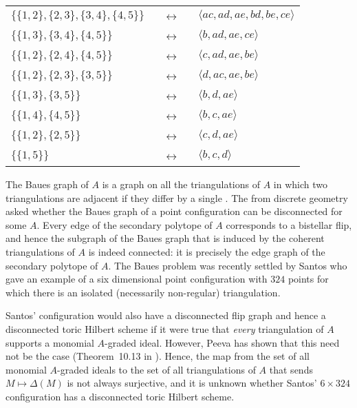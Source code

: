 \begin{tabular}{lll}
{$\{\{1,2\},\{2,3\},\{3,4\},\{4,5\}\}$}
&\,\,\,\,$\leftrightarrow$\,\,\,\,& $\langle ac, ad, ae, bd, be, ce
\rangle$ \\  
{$\{\{1,3\},\{3,4\},\{4,5\}\}$} &\,\,\,\,$\leftrightarrow$\,\,\,\,&
$\langle b, ad, ae, ce \rangle$ \\  
{$\{\{1,2\},\{2,4\},\{4,5\}\}$} &\,\,\,\,$\leftrightarrow$\,\,\,\,&
$\langle c, ad, ae, be \rangle$ \\ 
{$\{\{1,2\},\{2,3\},\{3,5\}\}$} &\,\,\,\,$\leftrightarrow$\,\,\,\,&
$\langle d, ac, ae, be \rangle$ \\  
{$\{\{1,3\},\{3,5\}\}$} &\,\,\,\,$\leftrightarrow$\,\,\,\,& $\langle
b, d, ae \rangle$ \\ 
{$\{\{1,4\},\{4,5\}\}$} &\,\,\,\,$\leftrightarrow$\,\,\,\,& $\langle
b, c, ae \rangle$ \\  
{$\{\{1,2\},\{2,5\}\}$} &\,\,\,\,$\leftrightarrow$\,\,\,\,& $\langle
c, d, ae \rangle$ \\ 
{$\{\{1,5\}\}$} &\,\,\,\,$\leftrightarrow$\,\,\,\,& $\langle b, c, d
\rangle$   
\end{tabular}

\medskip

The Baues graph of $A$ is a graph on all the triangulations of
$A$ in which two triangulations are adjacent if they differ by a
single {\em {}} \cite{HS:Reiner}. The {\em {}} from
discrete geometry asked whether the Baues graph of a point
configuration can be disconnected for some $A$. Every edge of the
secondary polytope of $A$ corresponds to a bistellar flip, and hence
the subgraph of the Baues graph that is induced by the coherent
triangulations of $A$ is indeed connected: it is precisely the edge
graph of the secondary polytope of $A$.  The Baues problem was
recently settled by Santos \cite{HS:San} who gave an example of a six
dimensional point configuration with $324$ points for which there is
an isolated (necessarily non-regular) triangulation.

Santos' configuration would also have a disconnected flip graph and hence
a disconnected toric Hilbert scheme if it were true that {\em every} 
triangulation of $A$ supports a monomial $A$-graded
ideal. However, Peeva has shown that this need not be the case
(Theorem~10.13 in \cite[\S 10]{HS:St2}). Hence, the map from the set of
all monomial $A$-graded ideals to the set of all triangulations of
$A$ that sends $M \mapsto \Delta(M)$ is not always
surjective, and it is unknown whether Santos' $6 \times 324$ 
configuration has a disconnected toric Hilbert scheme.  

